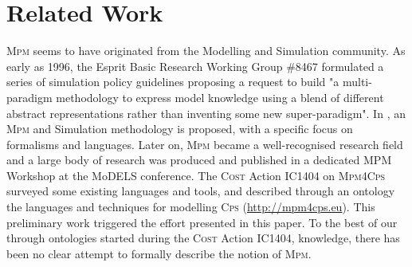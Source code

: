 \section{Related Work}
\label{sec:RelatedWork}


\textsc{Mpm} seems to have originated from the Modelling and 
Simulation community. As early as 1996, the Esprit Basic 
Research Working Group \#8467 formulated a series of simulation policy 
guidelines \cite{Vangheluwe-VansteenkisteKerckhoffs-1996} proposing a request 
to build "a multi-paradigm methodology to express model knowledge using a blend 
of different abstract representations rather than inventing some new 
super-paradigm". In \cite{Vangheluwe-Vansteenkiste1996}, an \textsc{Mpm} and 
Simulation methodology is proposed, with a specific focus on formalisms and 
languages. Later on, \textsc{Mpm} became a well-recognised research field and a 
large body of research was produced and published in a dedicated MPM Workshop 
at the MoDELS conference. The \textsc{Cost} Action IC1404 on \textsc{Mpm4Cps} 
surveyed some existing languages and tools, and described through an ontology 
the languages and techniques for modelling \textsc{Cps} 
(\url{http://mpm4cps.eu}). This 
preliminary work triggered the effort presented in this paper. To the best of 
our through ontologies started during the \textsc{Cost} Action IC1404, 
knowledge, there has been no clear attempt to formally describe the notion of 
\textsc{Mpm}.
